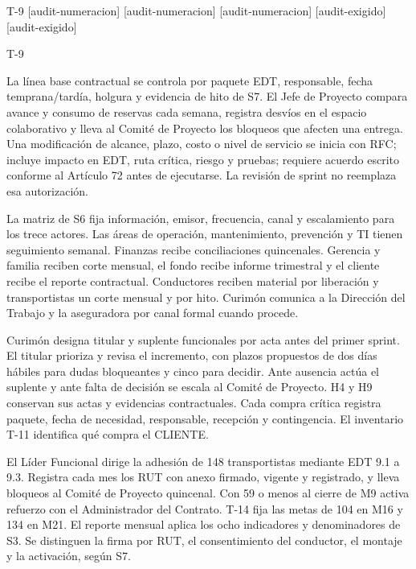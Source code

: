 \begin{formulario}{T-9}
\ExplSyntaxOff
{}[audit-numeracion]{\AuditAntesDeTabla}
[audit-numeracion]{\AuditEvaluarTabla}
[audit-numeracion]{\AuditMarcarNumerada}
\fi
[audit-exigido]{\AuditAntesDeTabla}
[audit-exigido]{\AuditEvaluarTabla}
\begin{contenidoExigido}{T-9}
\end{contenidoExigido}

La línea base contractual se controla por paquete EDT, responsable, fecha temprana/tardía, holgura y evidencia de hito de S7. El Jefe de Proyecto compara avance y consumo de reservas cada semana, registra desvíos en el espacio colaborativo y lleva al Comité de Proyecto los bloqueos que afecten una entrega. Una modificación de alcance, plazo, costo o nivel de servicio se inicia con RFC; incluye impacto en EDT, ruta crítica, riesgo y pruebas; requiere acuerdo escrito conforme al Artículo 72 antes de ejecutarse. La revisión de sprint no reemplaza esa autorización.

La matriz de S6 fija información, emisor, frecuencia, canal y escalamiento para los trece actores. Las áreas de operación, mantenimiento, prevención y TI tienen seguimiento semanal. Finanzas recibe conciliaciones quincenales. Gerencia y familia reciben corte mensual, el fondo recibe informe trimestral y el cliente recibe el reporte contractual. Conductores reciben material por liberación y transportistas un corte mensual y por hito. Curimón comunica a la Dirección del Trabajo y la aseguradora por canal formal cuando procede.

Curimón designa titular y suplente funcionales por acta antes del primer sprint. El titular prioriza y revisa el incremento, con plazos propuestos de dos días hábiles para dudas bloqueantes y cinco para decidir. Ante ausencia actúa el suplente y ante falta de decisión se escala al Comité de Proyecto. H4 y H9 conservan sus actas y evidencias contractuales. Cada compra crítica registra paquete, fecha de necesidad, responsable, recepción y contingencia. El inventario T-11 identifica qué compra el CLIENTE.

El Líder Funcional dirige la adhesión de 148 transportistas mediante EDT 9.1 a 9.3. Registra cada mes los RUT con anexo firmado, vigente y registrado, y lleva bloqueos al Comité de Proyecto quincenal. Con 59 o menos al cierre de M9 activa refuerzo con el Administrador del Contrato. T-14 fija las metas de 104 en M16 y 134 en M21. El reporte mensual aplica los ocho indicadores y denominadores de S3. Se distinguen la firma por RUT, el consentimiento del conductor, el montaje y la activación, según S7.
\end{formulario}
